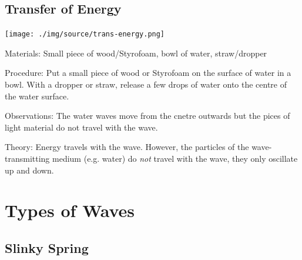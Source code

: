 \begin{multicols}{2}
\subsection{Transfer of Energy}

\begin{center}
\texttt{[image: ./img/source/trans-energy.png]}
\end{center}

\begin{description*}
\item[Materials:]{Small piece of wood/Styrofoam, bowl of water, straw/dropper}
\item[Procedure:]{Put a small piece of wood or Styrofoam on the surface of water in a bowl. With a dropper or straw, release a few drops of water onto the centre of the water surface.}
\item[Observations:]{The water waves move from the cnetre outwards but the pices of light material do not travel with the wave.}
\item[Theory:]{Energy travels with the wave. However, the particles of the wave-transmitting medium (e.g. water) do \emph{not} travel with the wave, they only oscillate up and down.}
\end{description*}


\section*{Types of Waves}


\subsection{Slinky Spring}



\end{multicols}
